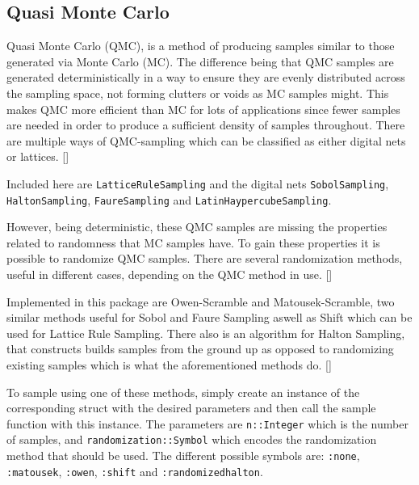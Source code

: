 \subsection{Quasi Monte Carlo}



\label{12969375726647060471}{}


Quasi Monte Carlo (QMC), is a method of producing samples similar to those generated via Monte Carlo (MC). The difference being that QMC samples are generated deterministically in a way to ensure they are evenly distributed across the sampling space, not forming clutters or voids as MC samples might. This makes QMC more efficient than MC for lots of applications since fewer samples are needed in order to produce a sufficient density of samples throughout. There are multiple ways of QMC-sampling which can be classified as either digital nets or lattices. []



Included here are \texttt{LatticeRuleSampling} and the digital nets \texttt{SobolSampling}, \texttt{HaltonSampling}, \texttt{FaureSampling} and \texttt{LatinHaypercubeSampling}.



However, being deterministic, these QMC samples are missing the properties related to randomness that MC samples have. To gain these properties it is possible to randomize QMC samples. There are several randomization methods, useful in different cases, depending on the QMC method in use. []



Implemented in this package are Owen-Scramble and Matousek-Scramble, two similar methods useful for Sobol and Faure Sampling aswell as Shift which can be used for Lattice Rule Sampling. There also is an algorithm for Halton Sampling, that constructs builds samples from the ground up as opposed to randomizing existing samples which is what the aforementioned methods do. []



To sample using one of these methods, simply create an instance of the corresponding struct with the desired parameters and then call the sample function with this instance. The parameters are \texttt{n::Integer} which is the number of samples, and \texttt{randomization::Symbol} which encodes the randomization method that should be used. The different possible symbols are: \texttt{:none}, \texttt{:matousek}, \texttt{:owen}, \texttt{:shift} and \texttt{:randomizedhalton}.






